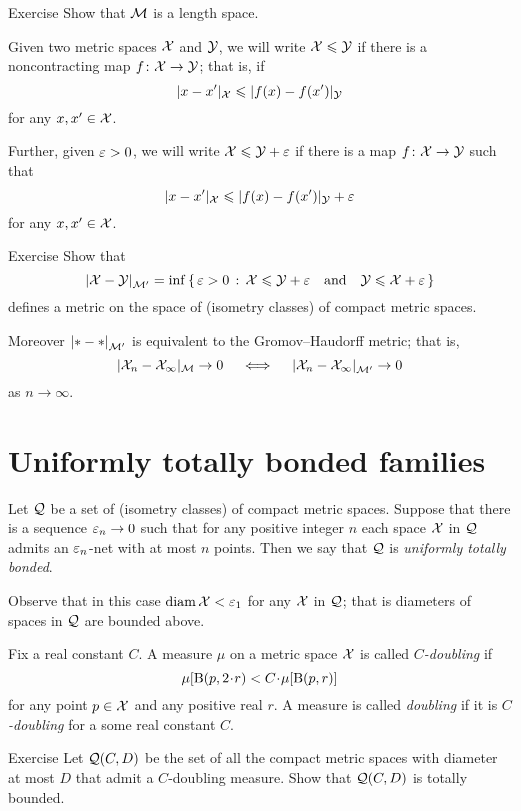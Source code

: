 \begin{thm}{Exercise}
Show that $\mathcal{M}$ is a length space.
\end{thm}

Given two metric spaces $\mathcal{X}$ and $\mathcal{Y}$, we will write $\mathcal{X}\leqslant \mathcal{Y}$ if there is a noncontracting map $f\colon\mathcal{X}\to \mathcal{Y}$;
that is, if 
$$ |x-x'|_{\mathcal{X}}\leqslant|f(x)-f(x')|_{\mathcal{Y}}$$
for any $x,x'\in \mathcal{X}$.

Further, given $\varepsilon>0$, we will write $\mathcal{X}\leqslant \mathcal{Y}+\varepsilon$
if there is a map $f\colon\mathcal{X}\to \mathcal{Y}$ such that 
$$|x-x'|_{\mathcal{X}}\leqslant|f(x)-f(x')|_{\mathcal{Y}}+\varepsilon$$
for any $x,x'\in \mathcal{X}$.

\begin{thm}{Exercise}\label{ex:GH-po}
Show that 
$$\dist{\spc{X}}{\spc{Y}}{\spc{M}'}=\inf\set{\eps>0}{\spc{X}\le \spc{Y}+\eps
\quad\text{and}\quad
\spc{Y}\le \spc{X}+\eps}$$
defines a metric on the space of (isometry classes) of compact metric spaces.

Moreover $\dist{*}{*}{\spc{M}'}$ is equivalent to the Gromov--Haudorff metric;
that is,
$$|\spc{X}_n-\spc{X}_\infty|_{\mathcal{M}}\to 0 
\quad\iff\quad 
\dist{\spc{X}_n}{\spc{X}_\infty}{\spc{M}'}\to 0$$ 
as $n\to\infty$.
\end{thm}


\section{Uniformly totally bonded families}

Let $\mathcal{Q}$ be a set of (isometry classes) of compact metric spaces.
Suppose that there is a sequence $\varepsilon_n\to 0$ such that for any positive integer $n$ each space $\mathcal{X}$ in $\mathcal{Q}$ admits an $\varepsilon_n$-net with at most $n$ points.
Then we say that $\mathcal{Q}$ is \emph{uniformly totally bonded}.

Observe that in this case $\operatorname{\rm diam}\nolimits\mathcal{X}<\varepsilon_1$ for any  $\mathcal{X}$ in $\mathcal{Q}$; that is diameters of spaces in $\mathcal{Q}$ are bounded above.

Fix a real constant $C$.
A measure $\mu$ on a metric space $\mathcal{X}$ is called \emph{$C$-doubling} if
\[\mu[\oBall(p,2\cdot r)< C\cdot\mu[\oBall(p,r)]\]
for any point $p\in \mathcal{X}$ and any positive real $r$.
A measure is called \emph{doubling} if it is \emph{$C$-doubling} for a some real constant $C$.

\begin{thm}{Exercise}\label{pr:doubling}
Let $\mathcal{Q}(C,D)$ be the set of all the compact metric spaces with diameter at most $D$ that admit a $C$-doubling measure.
Show that $\mathcal{Q}(C,D)$ is totally bounded.
\end{thm}

